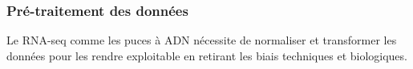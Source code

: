

\subsubsection{Pré-traitement des données}

Le RNA-seq comme les puces à ADN nécessite de normaliser et transformer les données pour les rendre exploitable en retirant les biais techniques et biologiques. 

